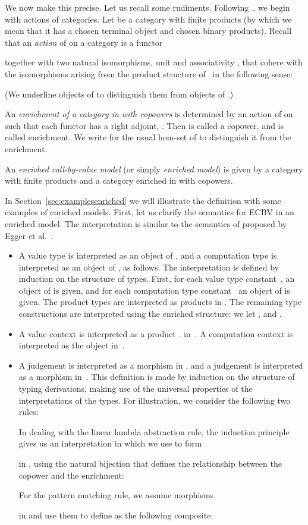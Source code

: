 \documentclass{LMCS}
\newcommand{\ECBV}{ECBV}
\begin{document}
We now make this precise. Let us recall some rudiments.
Following~\cite{JanelidzeKelly:actions,GordonPower:EnrichmentThroughVariation}, we begin with actions of
categories.  Let  be a category with finite products
(by which we mean that it has a chosen terminal object and chosen
binary products).
Recall that an \emph{action} of  on a category  is a functor
 
together with 
two natural isomorphisms, unit  and associativity
,
that cohere with the isomorphisms arising from 
the product structure of~ in the following sense:

(We underline objects of  to distinguish them from objects of 
.)

An \emph{enrichment of a category  in  with copowers} is
determined by an action of  on  such that each functor
 has a right adjoint,
.  Then  is called
a copower, and  is called enrichment.  
We write  for the usual hom-set of 
to distinguish it from the enrichment.


\begin{defi}
\label{def:enrichedmodel}
An \emph{enriched call-by-value model} (or simply \emph{enriched model}) is given by a category 
 with finite products
and a category  enriched in  with copowers.
\end{defi}
In Section~\ref{sec:examplesenriched}
we will illustrate the definition with some examples of enriched models.
First, let us clarify the 
semantics for {\ECBV} 
in an enriched model.
The interpretation is similar to the semantics of 
 proposed by Egger et al.~\cite{Mogelberg:CSL:09}. 
\begin{itemize}
\item 
A value type  is interpreted as an object  of ,
and a computation type  is interpreted 
as an object  of , as follows.
The interpretation is defined by induction on the structure of types. 
First, for each value type constant~, 
an object  of  is given,
and for each computation type constant~ 
an object  of  is given.
The product types are interpreted as products in 
.
The remaining type constructions are interpreted using the 
enriched structure:
we let ,
and . 
\item A value context 
is interpreted as a product .
in~.
A computation context  is interpreted as the object
 in~.
\item 
A judgement  is interpreted
as a morphism  in ,
and a judgement  is interpreted
as a morphism  in~.
This definition is made by induction on the structure of 
typing derivations, making use of the universal properties of the 
interpretations of the types.
For illustration, we consider the following two rules:

In dealing with the linear lambda abstraction rule,
the induction principle gives us an interpretation
 in 
which we use to form 
 
in , using the natural bijection
that defines the relationship between the copower and the enrichment:

For the pattern matching rule,
we assume morphisms 

in  and use them to 
define 
as the following composite:

\end{itemize}
\end{document}
